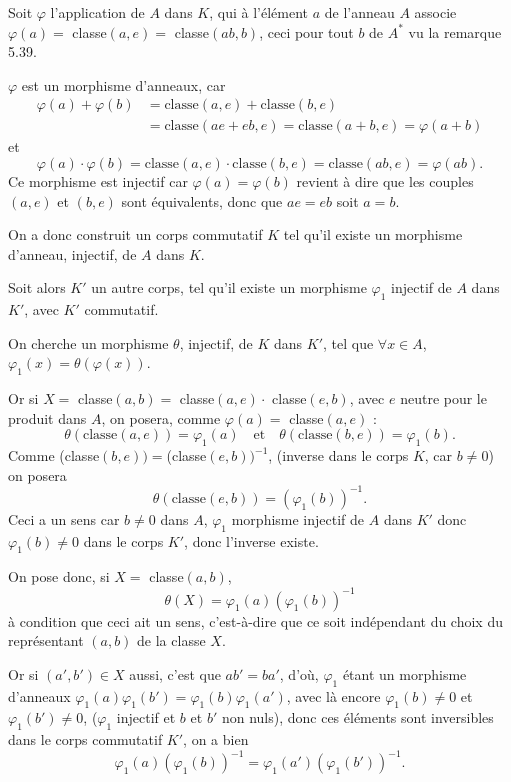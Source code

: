 Soit $\varphi$ l'application de $A$ dans $K$, qui à l'élément $a$ de l'anneau $A$ associe $\varphi(a)=$ classe$(a,e)=$ classe$(ab,b)$, ceci pour tout $b$ de $A^*$ vu la remarque 5.39.

$\varphi$ est un morphisme d'anneaux, car
\begin{align*}
\varphi(a)+\varphi(b)&=\text{classe}(a,e)+\text{classe}(b,e)\\
&=\text{classe}(ae+eb,e)=\text{classe}(a+b,e)=\varphi(a+b)
\end{align*}
et
\[
\varphi(a)\cdot\varphi(b)=\text{classe}(a,e)\cdot\text{classe}(b,e)=\text{classe}(ab,e)=\varphi(ab).
\]
Ce morphisme est injectif car $\varphi(a)=\varphi(b)$ revient à dire que les couples $(a,e)$ et $(b,e)$ sont équivalents, donc que $ae=eb$ soit $a=b$.

On a donc construit un corps commutatif $K$ tel qu'il existe un morphisme d'anneau, injectif, de $A$ dans $K$.

Soit alors $K'$ un autre corps, tel qu'il existe un morphisme $\varphi_1$ injectif de $A$ dans $K'$, avec $K'$ commutatif.

On cherche un morphisme $\theta$, injectif, de $K$ dans $K'$, tel que $\forall x\in A$, $\varphi_1(x)=\theta(\varphi(x))$.

Or si $X=$ classe$(a,b)=$ classe$(a,e)\cdot$ classe$(e,b)$, avec $e$ neutre pour le produit dans $A$, on posera, comme $\varphi(a)=$ classe$(a,e)$ :
\[
\theta(\text{classe}(a,e))=\varphi_1(a)\quad\text{et}\quad\theta(\text{classe}(b,e))=\varphi_1(b).
\]
Comme (classe$(b,e))=$(classe$(e,b))^{-1}$, (inverse dans le corps $K$, car $b\ne0$) on posera
\[
\theta(\text{classe}(e,b))=(\varphi_1(b))^{-1}.
\]
Ceci a un sens car $b\ne0$ dans $A$, $\varphi_1$ morphisme injectif de $A$ dans $K'$ donc $\varphi_1(b)\ne0$ dans le corps $K'$, donc l'inverse existe.

On pose donc, si $X=$ classe$(a,b)$,
\[
\theta(X)=\varphi_1(a)(\varphi_1(b))^{-1}
\]
à condition que ceci ait un sens, c'est-à-dire que ce soit indépendant du choix du représentant $(a,b)$ de la classe $X$.

Or si $(a',b')\in X$ aussi, c'est que $ab'=ba'$, d'où, $\varphi_1$ étant un morphisme d'anneaux $\varphi_1(a)\varphi_1(b')=\varphi_1(b)\varphi_1(a')$, avec là encore $\varphi_1(b)\ne0$ et $\varphi_1(b')\ne0$, ($\varphi_1$ injectif et $b$ et $b'$ non nuls), donc ces éléments sont inversibles dans le corps commutatif $K'$, on a bien
\[
\varphi_1(a)(\varphi_1(b))^{-1}=\varphi_1(a')(\varphi_1(b'))^{-1}.
\]

